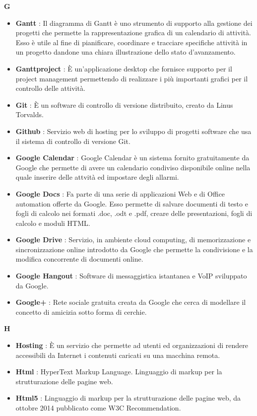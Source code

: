 \newpage
{\huge \textbf{G}}
\begin{flushleft}
\begin{itemize}[label={}]
\item \textbf{Gantt} : Il diagramma di Gantt è uno strumento di supporto alla gestione dei progetti che permette la rappresentazione grafica di un calendario di attività. Esso è utile al fine di pianificare, coordinare e tracciare specifiche attività in un progetto dandone una chiara illustrazione dello stato d'avanzamento.
\item \textbf{Ganttproject} : È un'applicazione desktop che fornisce supporto per il project management permettendo di realizzare i più importanti grafici per il controllo delle attività.
\item \textbf{Git} : È un software di controllo di versione distribuito, creato da Linus Torvalds.
\item \textbf{Github} : Servizio web di hosting per lo sviluppo di progetti software che usa il sistema di controllo di versione Git.
\item \textbf{Google Calendar} : Google Calendar è un sistema fornito gratuitamente da Google che permette di avere un calendario condiviso disponibile online nella quale inserire delle attvità ed impostare degli allarmi.
\item \textbf{Google Docs} : Fa parte di una serie di applicazioni Web e di Office automation offerte da Google. Esso permette di salvare documenti di testo e fogli di calcolo nei formati .doc, .odt e .pdf, creare delle presentazioni, fogli di calcolo e moduli HTML.
\item \textbf{Google Drive} : Servizio, in ambiente cloud computing, di memorizzazione e sincronizzazione online introdotto da Google che permette la condivisione e la modifica concorrente di documenti online.
\item \textbf{Google Hangout} : Software di messaggistica istantanea e VoIP sviluppato da Google.
\item \textbf{Google+} : Rete sociale gratuita creata da Google che cerca di modellare il concetto di amicizia sotto forma di cerchie.
\end{itemize}
\end{flushleft}
\newpage
{\huge \textbf{H}}
\begin{flushleft}
\begin{itemize}[label={}]
\item \textbf{Hosting} : È un servizio che permette ad utenti ed organizzazioni di rendere accessibili da Internet i contenuti caricati su una macchina remota.
\item \textbf{Html} : HyperText Markup Language. Linguaggio di markup per la strutturazione delle pagine web.
\item \textbf{Html5} : Linguaggio di markup per la strutturazione delle pagine web, da ottobre 2014 pubblicato come W3C Recommendation.
\end{itemize}
\end{flushleft}
